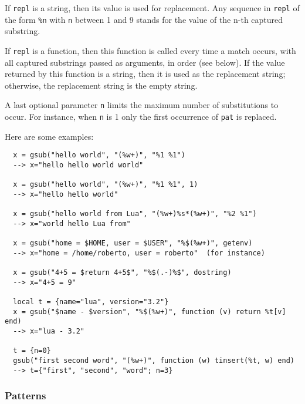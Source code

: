 \documentclass[11pt]{article}
\begin{document}
If \verb|repl| is a string, then its value is used for replacement.
Any sequence in \verb|repl| of the form \verb|%n|
with \verb|n| between 1 and 9
stands for the value of the n-th captured substring.

If \verb|repl| is a function, then this function is called every time a
match occurs, with all captured substrings passed as arguments,
in order (see below).
If the value returned by this function is a string,
then it is used as the replacement string;
otherwise, the replacement string is the empty string.

A last optional parameter \verb|n| limits
the maximum number of substitutions to occur.
For instance, when \verb|n| is 1 only the first occurrence of
\verb|pat| is replaced.

Here are some examples:
\begin{verbatim}
  x = gsub("hello world", "(%w+)", "%1 %1")
  --> x="hello hello world world"

  x = gsub("hello world", "(%w+)", "%1 %1", 1)
  --> x="hello hello world"

  x = gsub("hello world from Lua", "(%w+)%s*(%w+)", "%2 %1")
  --> x="world hello Lua from"

  x = gsub("home = $HOME, user = $USER", "%$(%w+)", getenv)
  --> x="home = /home/roberto, user = roberto"  (for instance)

  x = gsub("4+5 = $return 4+5$", "%$(.-)%$", dostring)
  --> x="4+5 = 9"

  local t = {name="lua", version="3.2"}
  x = gsub("$name - $version", "%$(%w+)", function (v) return %t[v] end)
  --> x="lua - 3.2"

  t = {n=0}
  gsub("first second word", "(%w+)", function (w) tinsert(%t, w) end)
  --> t={"first", "second", "word"; n=3}
\end{verbatim}


\subsubsection*{Patterns} \label{pm}
\end{document}
